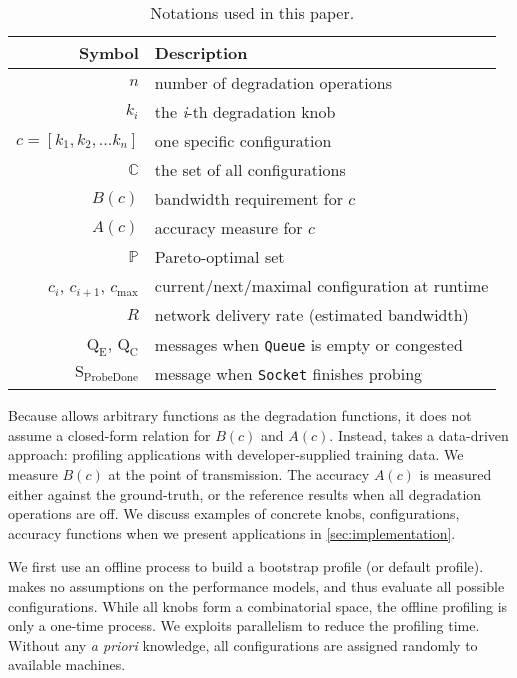 \begin{table}
  \footnotesize
  \centering
  \begin{tabular}{r l}
    \toprule
    \textbf{Symbol} & \textbf{Description} \\
    \midrule
    $n$ & number of degradation operations \\
    $k_i$ & the \textit{i}-th degradation knob \\
    $c = [k_{1}, k_{2}, ... k_{n}]$ & one specific configuration \\
    $\mathbb{C}$ & the set of all configurations \\
    \midrule
    $B(c)$ & bandwidth requirement for $c$ \\
    $A(c)$ & accuracy measure for $c$ \\
    $\mathbb{P}$ & Pareto-optimal set \\
    \midrule
    $c_i$, $c_{i+1}$, $c_{\max}$ & current/next/maximal configuration at runtime \\
    $R$ & network delivery rate (estimated bandwidth) \\
    $\text{Q}_\text{E}$, $\text{Q}_\text{C}$ & messages when \texttt{Queue} is empty or congested \\
    $\text{S}_\text{ProbeDone}$ & message when \texttt{Socket} finishes probing \\
    \bottomrule
  \end{tabular}
  \caption{Notations used in this paper.}
  \label{tab:notations}
\end{table}

Because \sysname{} allows arbitrary functions as the degradation functions, it
does not assume a closed-form relation for $B(c)$ and $A(c)$. Instead,
\sysname{} takes a data-driven approach: profiling applications with
developer-supplied training data.  We measure $B(c)$ at the point of
transmission. The accuracy $A(c)$ is measured either against the ground-truth,
or the reference results when all degradation operations are off.  We discuss
examples of concrete knobs, configurations, accuracy functions when we present
applications in \autoref{sec:implementation}.

 We first use an offline process to build a bootstrap
profile (or default profile).  \sysname{} makes no assumptions on the
performance models, and thus evaluate all possible configurations.  While all
knobs form a combinatorial space, the offline profiling is only a one-time
process.  We exploits parallelism to reduce the profiling time.  Without any
\textit{a priori} knowledge, all configurations are assigned randomly to
available machines.

